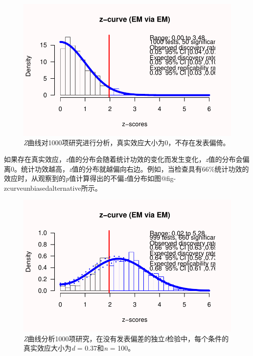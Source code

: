 \documentclass[
  letterpaper,
  DIV=11,
  numbers=noendperiod]{scrreprt}
\begin{document}
\begin{figure}

{\centering \includegraphics[width=1\textwidth,height=\textheight]{12-bias_files/figure-pdf/fig-zcurveunbiasednull-1.pdf}

}

\caption{\label{fig-zcurveunbiasednull}\emph{Z}曲线对1000项研究进行分析，真实效应大小为0，不存在发表偏倚。}

\end{figure}

如果存在真实效应，\emph{z}值的分布会随着统计功效的变化而发生变化，\emph{z}值的分布会偏离0。统计功效越高，\emph{z}值的分布就越偏向右边。例如，当检查具有66\%统计功效的效应时，从观察到的\emph{p}值计算得出的不偏\emph{z}值分布如图@fig-zcurveunbiasedalternative所示。

\begin{figure}

{\centering \includegraphics[width=1\textwidth,height=\textheight]{12-bias_files/figure-pdf/fig-zcurveunbiasedalternative-1.pdf}

}

\caption{\label{fig-zcurveunbiasedalternative}\emph{Z}曲线分析1000项研究，在没有发表偏差的独立\emph{t}检验中，每个条件的真实效应大小为\emph{d}
= 0.37和\emph{n} = 100。}

\end{figure}
\end{document}

